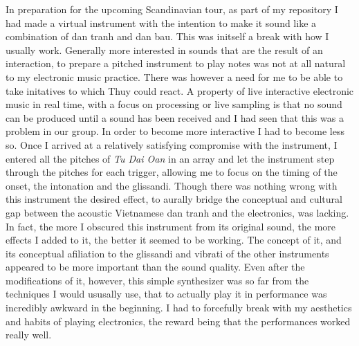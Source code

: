 \documentclass[a4paper]{article}
\begin{document}
In preparation for the upcoming Scandinavian tour, as part of my repository I had made a virtual instrument with the intention to make it sound like a combination of dan tranh and dan bau. This was initself a break with how I usually work. Generally more interested in sounds that are the result of an interaction, to prepare a pitched instrument to play notes was not at all natural to my electronic music practice. There was however a need for me to be able to take initatives to which Thuy could react. A property of live interactive electronic music in real time, with a focus on processing or live sampling is that no sound can be produced until a sound has been received and I had seen that this was a problem in our group. In order to become more interactive I had to become less so. Once I arrived at a relatively satisfying compromise with the instrument, I entered all the pitches of \emph{Tu Dai Oan} in an array and let the instrument step through the pitches for each trigger, allowing me to focus on the timing of the onset, the intonation and the glissandi. Though there was nothing wrong with this instrument the desired effect, to aurally bridge the conceptual and cultural gap between the acoustic Vietnamese dan tranh and the electronics, was lacking. In fact, the more I obscured this instrument from its original sound, the more effects I added to it, the better it seemed to be working. The concept of it, and its conceptual afiliation to the glissandi and vibrati of the other instruments appeared to be more important than the sound quality. Even after the modifications of it, however, this simple synthesizer was so far from the techniques I would ususally use, that to actually play it in performance was incredibly awkward in the beginning. I had to forcefully break with my aesthetics and habits of playing electronics, the reward being that the performances worked really well.
\end{document}
